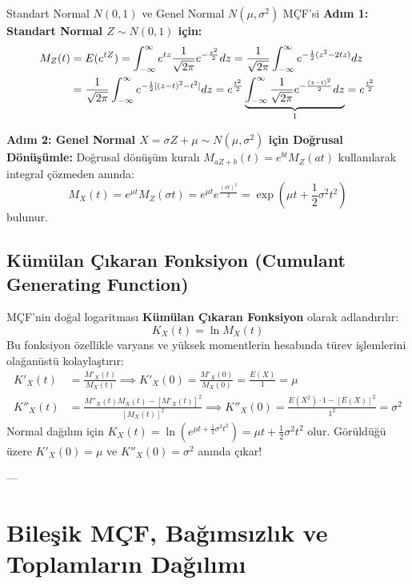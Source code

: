 \documentclass[12pt,a4paper]{article}
\begin{document}
\begin{ornek}{Standart Normal $N(0,1)$ ve Genel Normal $N(\mu, \sigma^2)$ MÇF'si}
\textbf{Adım 1: Standart Normal $Z \sim N(0,1)$ için:}
\begin{align}
    M_Z(t) &= E(e^{tZ}) = \int_{-\infty}^{\infty} e^{tz} \frac{1}{\sqrt{2\pi}} e^{-\frac{z^2}{2}} dz = \frac{1}{\sqrt{2\pi}} \int_{-\infty}^{\infty} e^{-\frac{1}{2}(z^2 - 2tz)} dz \notag \\
    &= \frac{1}{\sqrt{2\pi}} \int_{-\infty}^{\infty} e^{-\frac{1}{2}[(z-t)^2 - t^2]} dz = e^{\frac{t^2}{2}} \underbrace{\int_{-\infty}^{\infty} \frac{1}{\sqrt{2\pi}} e^{-\frac{(z-t)^2}{2}} dz}_{1} = e^{\frac{t^2}{2}}
\end{align}

\textbf{Adım 2: Genel Normal $X = \sigma Z + \mu \sim N(\mu, \sigma^2)$ için Doğrusal Dönüşümle:}  
Doğrusal dönüşüm kuralı $M_{aZ+b}(t) = e^{bt} M_Z(at)$ kullanılarak integral çözmeden anında:
\begin{equation}
    \boxed{M_X(t) = e^{\mu t} M_Z(\sigma t) = e^{\mu t} e^{\frac{(\sigma t)^2}{2}} = \exp\left( \mu t + \frac{1}{2}\sigma^2 t^2 \right)}
\end{equation}
bulunur.
\end{ornek}

\subsection{Kümülan Çıkaran Fonksiyon (Cumulant Generating Function)}
MÇF'nin doğal logaritması \textbf{Kümülan Çıkaran Fonksiyon} olarak adlandırılır:
\begin{equation}
    K_X(t) = \ln M_X(t)
\end{equation}
Bu fonksiyon özellikle varyans ve yüksek momentlerin hesabında türev işlemlerini olağanüstü kolaylaştırır:
\begin{align}
    K'_X(t) &= \frac{M'_X(t)}{M_X(t)} \implies K'_X(0) = \frac{M'_X(0)}{M_X(0)} = \frac{E(X)}{1} = \mu \\
    K''_X(t) &= \frac{M''_X(t) M_X(t) - [M'_X(t)]^2}{[M_X(t)]^2} \implies K''_X(0) = \frac{E(X^2) \cdot 1 - [E(X)]^2}{1^2} = \sigma^2
\end{align}
Normal dağılım için $K_X(t) = \ln\left( e^{\mu t + \frac{1}{2}\sigma^2 t^2} \right) = \mu t + \frac{1}{2}\sigma^2 t^2$ olur.  
Görüldüğü üzere $K'_X(0) = \mu$ ve $K''_X(0) = \sigma^2$ anında çıkar!

---

\section{Bileşik MÇF, Bağımsızlık ve Toplamların Dağılımı}
\end{document}
